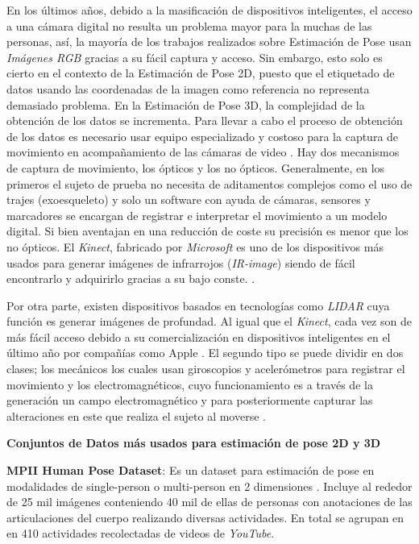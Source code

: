 En los últimos años, debido a la masificación
de dispositivos inteligentes, el acceso a una cámara digital no resulta un problema mayor para la muchas
de las personas, así, la mayoría de los trabajos realizados sobre Estimación de Pose usan
\textit{Imágenes RGB} gracias a su fácil captura y acceso.
Sin embargo, esto solo es cierto en el contexto de la Estimación de Pose 2D, puesto que el etiquetado de datos
usando las coordenadas de la imagen como referencia no representa demasiado problema. En la
Estimación de Pose 3D, la complejidad de la obtención de los datos se incrementa. Para llevar a cabo
el proceso de obtención de los datos es necesario usar equipo especializado y costoso para la captura
de movimiento en acompañamiento de las cámaras de video \cite{6682899}. Hay dos mecanismos de captura
de movimiento, los ópticos y los no ópticos. Generalmente, en los primeros el sujeto de prueba no
necesita de aditamentos complejos como el uso de trajes
(exoesqueleto) y solo un software con ayuda de cámaras, sensores y marcadores se
encargan de registrar e interpretar el movimiento a un modelo digital. Si bien
aventajan en una reducción de coste su precisión es menor que los no ópticos.
El \textit{Kinect}, fabricado por \textit{Microsoft} es uno de los dispositivos más usados
para generar imágenes de infrarrojos (\textit{IR-image}) siendo de fácil encontrarlo y adquirirlo
gracias a su bajo conste. \cite{6165146} \cite{Izadi11kinectfusion:real-time}.

Por otra parte, existen dispositivos basados en tecnologías como \textit{LIDAR} cuya función es
generar imágenes de profundad. Al igual que el \textit{Kinect}, cada vez son de más fácil acceso
debido a su comercialización en dispositivos inteligentes en el último año por compañías como Apple
\cite{DBLP:journals/corr/abs-1711-06396}. El segundo tipo se puede dividir en dos clases;
los mecánicos los cuales usan giroscopios y acelerómetros para registrar el
movimiento y los electromagnéticos, cuyo funcionamiento es a través de la generación un campo
electromagnético y para posteriormente capturar las alteraciones en este que realiza el sujeto al
moverse \cite{articleMotion}.

\textbf{Conjuntos de Datos más usados para estimación de pose 2D y 3D}

\textbf{MPII Human Pose Dataset}: Es un dataset para estimación de pose en modalidades de
single-person o multi-person en 2 dimensiones \cite{andriluka14cvpr}. Incluye al rededor de 25 mil
imágenes conteniendo
40 mil de ellas de personas con anotaciones de las articulaciones del cuerpo realizando diversas
actividades. En total se agrupan en en 410 actividades recolectadas de videos de \textit{YouTube}.

